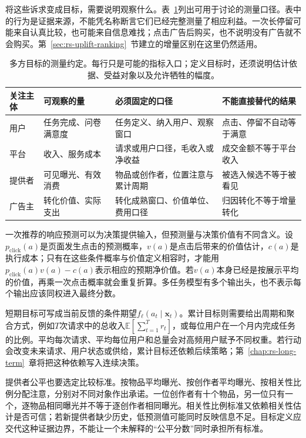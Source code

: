 将这些诉求变成目标，需要说明观察什么。表~\ref{tab:rs-objective-contracts}列出可用于讨论的测量口径。表中的行为是证据来源，不能凭名称断言它们已经完整测量了相应利益。一次长停留可能来自认真比较，也可能来自信息难找；点击广告后购买，也不说明没有广告就不会购买。第~\ref{sec:rs-uplift-ranking}~节建立的增量区别在这里仍然适用。

\begin{table}[htbp]
 \centering
 \small
 \begin{tabularx}{\linewidth}{@{}p{19mm}p{31mm}X X@{}}
  \toprule
  关注主体 & 可观察的量 & 必须固定的口径 & 不能直接替代的结果 \\
  \midrule
  用户 & 任务完成、问卷满意度 & 任务定义、纳入用户、观察窗口 & 点击、停留不自动等于满意 \\
  平台 & 收入、服务成本 & 请求或用户口径，毛收入或净收益 & 成交金额不等于平台收入 \\
  提供者 & 可见曝光、有效消费 & 物品或创作者，位置注意与累计周期 & 被选入候选不等于被看见 \\
  广告主 & 转化价值、实际支出 & 转化成熟窗口、价值单位、费用口径 & 归因转化不等于增量转化 \\
  \bottomrule
 \end{tabularx}
 \caption{多方目标的测量约定。每行只是可能的指标入口；定义目标时，还须说明估计依据、受益对象以及允许牺牲的幅度。}
 \label{tab:rs-objective-contracts}
\end{table}

一次推荐的响应预测可以为决策提供输入，但预测量与决策价值有不同含义。设$p_{\mathrm{click}}(a)$是页面发生点击的预测概率，$v(a)$是点击后带来的价值估计，$c(a)$是执行成本；只有在这些条件概率与价值定义相容时，才能用$p_{\mathrm{click}}(a)v(a)-c(a)$表示相应的预期净价值。若$v(a)$本身已经是按展示平均的价值，再乘一次点击概率就会重复折算。多任务模型有多个输出头，也不表示每个输出应该同权进入最终分数。

短期目标可写成当前反馈的条件期望$f_\ell(a_t\mid\bm{x}_t)$。累计目标则需要给出周期和聚合方式，例如$T$次请求中的总收入$\mathbb{E}[\sum_{t=1}^{T}r_t]$，或每位用户在一个月内完成任务的比例。平均每次请求、平均每位用户和总量会对高频用户赋予不同权重。若行动会改变未来请求、用户状态或供给，累计目标还依赖后续策略；第~\ref{chap:rs-long-term}~章将把这种依赖写入连续决策。

提供者公平也要选定比较标准。按物品平均曝光、按创作者平均曝光、按相关性比例分配注意，分别对不同对象作出承诺。一位创作者有十个物品，另一位只有一个，逐物品相同曝光并不等于逐创作者相同曝光。相关性比例标准又依赖相关性估计是否可信；若新提供者缺少历史，低预测值可能同时反映信息不足。目标定义应交代这种证据边界，不能让一个未解释的“公平分数”同时承担所有标准。

